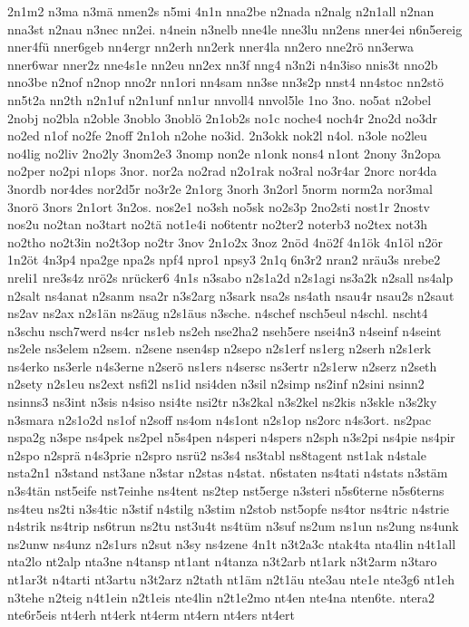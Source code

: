 {2n1m2
n3ma
n3mä
nmen2s
n5mi
4n1n
nna2be
n2nada
n2nalg
n2n1all
n2nan
nna3st
n2nau
n3nec
nn2ei.
n4nein
n3nelb
nne4le
nne3lu
nn2ens
nner4ei
n6n5ereig
nner4fü
nner6geb
nn4ergr
nn2erh
nn2erk
nner4la
nn2ero
nne2rö
nn3erwa
nner6war
nner2z
nne4s1e
nn2eu
nn2ex
nn3f
nng4
n3n2i
n4n3iso
nnis3t
nno2b
nno3be
n2nof
n2nop
nno2r
nn1ori
nn4sam
nn3se
nn3s2p
nnst4
nn4stoc
nn2stö
nn5t2a
nn2th
n2n1uf
n2n1unf
nn1ur
nnvoll4
nnvol5le
1no
3no.
no5at
n2obel
2nobj
no2bla
n2oble
3noblo
3noblö
2n1ob2s
no1c
noche4
noch4r
2no2d
no3dr
no2ed
n1of
no2fe
2noff
2n1oh
n2ohe
no3id.
2n3okk
nok2l
n4ol.
n3ole
no2leu
no4lig
no2liv
2no2ly
3nom2e3
3nomp
non2e
n1onk
nons4
n1ont
2nony
3n2opa
no2per
no2pi
n1ops
3nor.
nor2a
no2rad
n2o1rak
no3ral
no3r4ar
2norc
nor4da
3nordb
nor4des
nor2d5r
no3r2e
2n1org
3norh
3n2orl
5norm
norm2a
nor3mal
3norö
3nors
2n1ort
3n2os.
nos2e1
no3sh
no5sk
no2s3p
2no2sti
nost1r
2nostv
nos2u
no2tan
no3tart
no2tä
not1e4i
no6tentr
no2ter2
noterb3
no2tex
not3h
no2tho
no2t3in
no2t3op
no2tr
3nov
2n1o2x
3noz
2nöd
4nö2f
4n1ök
4n1öl
n2ör
1n2öt
4n3p4
npa2ge
npa2s
npf4
npro1
npsy3
2n1q
6n3r2
nran2
nräu3s
nrebe2
nreli1
nre3s4z
nrö2s
nrücker6
4n1s
n3sabo
n2s1a2d
n2s1agi
ns3a2k
n2sall
ns4alp
n2salt
ns4anat
n2sanm
nsa2r
n3s2arg
n3sark
nsa2s
ns4ath
nsau4r
nsau2s
n2saut
ns2av
ns2ax
n2s1än
ns2äug
n2s1äus
n3sche.
n4schef
nsch5eul
n4schl.
nscht4
n3schu
nsch7werd
ns4cr
ns1eb
ns2eh
nse2ha2
nseh5ere
nsei4n3
n4seinf
n4seint
ns2ele
ns3elem
n2sem.
n2sene
nsen4sp
n2sepo
n2s1erf
ns1erg
n2serh
n2s1erk
ns4erko
ns3erle
n4s3erne
n2serö
ns1ers
n4sersc
ns3ertr
n2s1erw
n2serz
n2seth
n2sety
n2s1eu
ns2ext
nsfi2l
ns1id
nsi4den
n3sil
n2simp
ns2inf
n2sini
nsinn2
nsinns3
ns3int
n3sis
n4siso
nsi4te
nsi2tr
n3s2kal
n3s2kel
ns2kis
n3skle
n3s2ky
n3smara
n2s1o2d
ns1of
n2soff
ns4om
n4s1ont
n2s1op
ns2orc
n4s3ort.
ns2pac
nspa2g
n3spe
ns4pek
ns2pel
n5s4pen
n4speri
n4spers
n2sph
n3s2pi
ns4pie
ns4pir
n2spo
n2sprä
n4s3prie
n2spro
nsrü2
ns3s4
ns3tabl
ns8tagent
nst1ak
n4stale
nsta2n1
n3stand
nst3ane
n3star
n2stas
n4stat.
n6staten
ns4tati
n4stats
n3stäm
n3s4tän
nst5eife
nst7einhe
ns4tent
ns2tep
nst5erge
n3steri
n5s6terne
n5s6terns
ns4teu
ns2ti
n3s4tic
n3stif
n4stilg
n3stim
n2stob
nst5opfe
ns4tor
ns4tric
n4strie
n4strik
ns4trip
ns6trun
ns2tu
nst3u4t
ns4tüm
n3suf
ns2um
ns1un
ns2ung
ns4unk
ns2unw
ns4unz
n2s1urs
n2sut
n3sy
ns4zene
4n1t
n3t2a3c
ntak4ta
nta4lin
n4t1all
nta2lo
nt2alp
nta3ne
n4tansp
nt1ant
n4tanza
n3t2arb
nt1ark
n3t2arm
n3taro
nt1ar3t
n4tarti
nt3artu
n3t2arz
n2tath
nt1äm
n2t1äu
nte3au
nte1e
nte3g6
nt1eh
n3tehe
n2teig
n4t1ein
n2t1eis
nte4lin
n2t1e2mo
nt4en
nte4na
nten6te.
ntera2
nte6r5eis
nt4erh
nt4erk
nt4erm
nt4ern
nt4ers
nt4ert
}
